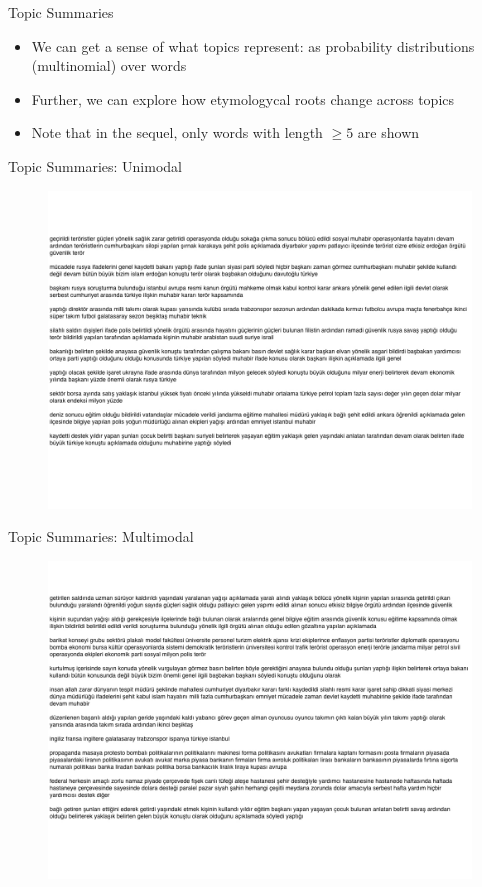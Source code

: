 \documentclass[pdf]{beamer}
\begin{document}
\begin{frame}{Topic Summaries}
\begin{itemize}
\item We can get a sense of what topics represent: as probability distributions (multinomial) over words
\item Further, we can explore how etymologycal roots change across topics
\item Note that in the sequel, only words with length $\geq 5$ are shown
\end{itemize}
\end{frame}

\begin{frame}{Topic Summaries: Unimodal}
\begin{figure}
\label{fig:sum}
\includegraphics*[width=\textwidth]{topics1.jpeg}
\end{figure}
\end{frame}

\begin{frame}{Topic Summaries: Multimodal}
\begin{figure}
\label{fig:sum21}
\includegraphics*[width=\textwidth]{topics2-1.jpeg}
\end{figure}
\end{frame}
\end{document}
